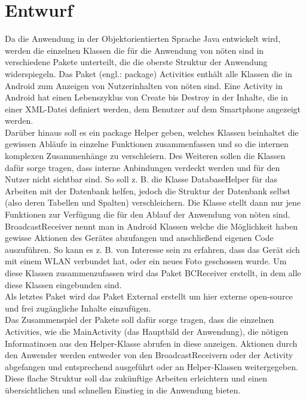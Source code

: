 \documentclass[10pt, a4paper]{scrreprt}
\begin{document}
\section{Entwurf}
Da die Anwendung in der Objektorientierten Sprache Java entwickelt wird, werden die einzelnen Klassen die für die Anwendung von nöten sind in verschiedene Pakete unterteilt, die die oberste Struktur der Anwendung widerspiegeln. Das Paket (engl.: package)  Activities enthält alle Klassen die in Android zum Anzeigen von Nutzerinhalten von nöten sind. Eine Activity in Android hat einen Lebenszyklus von Create bis Destroy in der Inhalte, die in einer XML-Datei definiert werden, dem Benutzer auf dem Smartphone angezeigt werden. \\
Darüber hinaus soll es ein package Helper geben, welches Klassen beinhaltet die gewissen Abläufe in einzelne Funktionen zusammenfassen und so die internen komplexen Zusammenhänge zu verschleiern. Des Weiteren sollen die Klassen dafür sorge tragen, dass interne Anbindungen verdeckt werden und für den Nutzer nicht sichtbar sind. So soll z. B. die Klasse DatabaseHelper für das Arbeiten mit der Datenbank helfen, jedoch die Struktur der Datenbank selbst (also deren Tabellen und Spalten) verschleichern. Die Klasse stellt dann nur jene Funktionen zur Verfügung die für den Ablauf der Anwendung von nöten sind. \\
BroadcastReceiver nennt man in Android Klassen welche die Möglichkeit haben gewisse Aktionen des Gerätes abzufangen und anschließend eigenen Code auszuführen. So kann es z. B. von Interesse sein zu erfahren, dass das Gerät sich mit einem WLAN verbundet hat, oder ein neues Foto geschossen wurde. Um diese Klassen zusammenzufassen wird das Paket BCReceiver erstellt, in dem alle diese Klassen eingebunden sind. \\
Als letztes Paket wird das Paket External erstellt um hier externe open-source und frei zugängliche Inhalte einzufügen. \\
Das Zusammenspiel der Pakete soll dafür sorge tragen, dass die einzelnen Activities, wie die MainActivity (das Hauptbild der Anwendung), die nötigen Informatinoen aus den Helper-Klasse abrufen in diese anzeigen. Aktionen durch den Anwender werden entweder von den BroadcastReceivern oder der Activity abgefangen und entsprechend ausgeführt oder an Helper-Klassen weitergegeben.  Diese flache Struktur soll das zukünftige Arbeiten erleichtern und einen übersichtlichen und schnellen Einstieg in die Anwendung bieten. \\ \\
\end{document}

